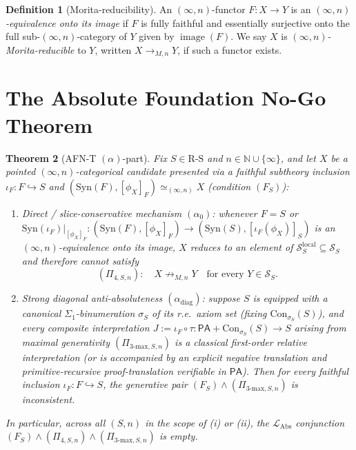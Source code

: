 \documentclass[11pt]{article}
\theoremstyle{plain}
\newtheorem{theorem}{Theorem}[section]
\theoremstyle{definition}
\newtheorem{definition}[theorem]{Definition}
\newcommand{\RS}{\mathrm{R\text{-}S}}
\newcommand{\cS}{\mathcal{S}}
\newcommand{\LAbs}{\mathcal{L}_{\mathrm{Abs}}}
\newcommand{\Syn}{\mathrm{Syn}}
\newcommand{\Con}{\mathrm{Con}}
\newcommand{\PA}{\mathsf{PA}}
\DeclareMathOperator{\image}{image}
\begin{document}
\begin{definition}[Morita-reducibility]\label{def:morita}
An $(\infty, n)$-functor $F : X \to Y$ is an \emph{$(\infty, n)$-equivalence onto its image} if $F$ is fully faithful and essentially surjective onto the full sub-$(\infty, n)$-category of $Y$ given by $\image(F)$. We say $X$ is \emph{$(\infty, n)$-Morita-reducible} to $Y$, written $X \to_{M, n} Y$, if such a functor exists.
\end{definition}

\section{The Absolute Foundation No-Go Theorem}\label{sec:afnt}

\begin{theorem}[AFN-T $(\alpha)$-part]\label{thm:afnt}
Fix $S \in \RS$ and $n \in \mathbb{N} \cup \{\infty\}$, and let $X$ be a pointed $(\infty, n)$-categorical candidate presented via a faithful subtheory inclusion $\iota_F : F \hookrightarrow S$ and $(\Syn(F), [\phi_X]_F) \simeq_{(\infty, n)} X$ (condition $(F_S)$):
\begin{enumerate}[nosep,label=(\roman*)]
\item \emph{Direct / slice-conservative mechanism $(\alpha_0)$}: whenever $F = S$ or $\Syn(\iota_F)|_{[\phi_X]_F} : (\Syn(F), [\phi_X]_F) \to (\Syn(S), [\iota_F(\phi_X)]_S)$ is an $(\infty, n)$-equivalence onto its image, $X$ reduces to an element of $\cS_S^{\mathrm{local}} \subseteq \cS_S$ and therefore cannot satisfy
\[
 (\Pi_{4, S, n}):\quad X \not\to_{M, n} Y \quad\text{for every } Y \in \cS_S.
\]
\item \emph{Strong diagonal anti-absoluteness $(\alpha_{\mathrm{diag}})$}: suppose $S$ is equipped with a canonical $\Sigma_1$-binumeration $\sigma_S$ of its r.e.\ axiom set (fixing $\Con_{\sigma_S}(S)$), and every composite interpretation $J := \iota_F \circ \tau : \PA + \Con_{\sigma_S}(S) \to S$ arising from maximal generativity $(\Pi_{3\text{-max}, S, n})$ is a classical first-order relative interpretation (or is accompanied by an explicit negative translation and primitive-recursive proof-translation verifiable in $\PA$). Then for every faithful inclusion $\iota_F : F \hookrightarrow S$, the generative pair $(F_S) \wedge (\Pi_{3\text{-max}, S, n})$ is inconsistent.
\end{enumerate}
In particular, across all $(S, n)$ in the scope of (i) or (ii), the $\LAbs$ conjunction $(F_S) \wedge (\Pi_{4, S, n}) \wedge (\Pi_{3\text{-max}, S, n})$ is empty.
\end{theorem}
\end{document}
